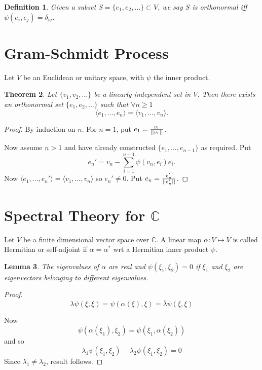\documentclass{notes}
\theoremstyle{plain}
\newtheorem{theorem}{Theorem}[chapter]
\newtheorem{definition}[theorem]{Definition}
\newtheorem{lemma}[theorem]{Lemma}
\begin{document}
\begin{definition}
  Given a subset $S = \{ e_1, e_2, \dots \} \subset V$, we say $S$ is
  orthonormal iff $\psi(e_i,e_j)=\delta_{ij}$.
\end{definition}

\section{Gram-Schmidt Process}

Let $V$ be an Euclidean or unitary space, with $\psi$ the inner
product.

\begin{theorem}
  Let $\{ v_1, v_2, \dots \}$ be a linearly independent set in $V$.
  Then there exists an orthonormal set $\{e_1, e_2, \dots \}$ such
  that $\forall n \ge 1$
\[
\langle e_1, \dots ,e_n \rangle = \langle v_1, \dots, v_n \rangle.
\] 
\end{theorem}

\begin{proof}
  By induction on $n$.  For $n=1$, put $e_1 =
  \frac{v_1}{\left|\left|v_1\right|\right|}$.
  
  Now assume $n > 1$ and have already constructed $\{ e_1, \dots,
  e_{n-1}\}$ as required.  Put
\[
e_n' = v_n - \sum_{i=1}^{n-1} \psi(v_n,e_i)e_i.
\]
Now $\langle e_1, \dots ,e_n' \rangle = \langle v_1, \dots, v_n
\rangle$ so $e_n' \ne 0$.  Put $e_n = \frac{e_n'}{\left|\left|e_n'\right|\right|}$.
\end{proof}

\section{Spectral Theory for $\mathbb{C}$}

Let $V$ be a finite dimensional vector space over $\mathbb{C}$.  A
linear map $\alpha : V \mapsto V$ is called Hermitian or self-adjoint
if $\alpha = \alpha^*$ wrt a Hermitian inner product $\psi$.

\begin{lemma}
  The eigenvalues of $\alpha$ are real and $\psi(\xi_1,\xi_2)=0$ if
  $\xi_1$ and $\xi_2$ are eigenvectors belonging to different
  eigenvalues.
\end{lemma}

\begin{proof}
\[
\lambda \psi(\xi,\xi)= \psi(\alpha(\xi),\xi) =
\overline{\lambda}\psi(\xi,\xi)
\]

Now
\[
\psi(\alpha(\xi_1),\xi_2)=\psi(\xi_1,\alpha(\xi_2))
\]
and so
\[
\lambda_1\psi(\xi_1,\xi_2)-\lambda_2\psi(\xi_1,\xi_2) = 0
\]
Since $\lambda_1 \ne \lambda_2$, result follows.
\end{proof}
\end{document}
